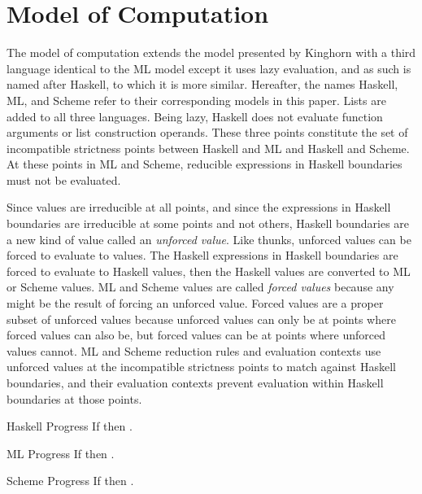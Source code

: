 \section{Model of Computation}

The model of computation extends the model presented by Kinghorn \cite{kinghorn07} with a third language identical to the ML model except it uses lazy evaluation, and as such is named after Haskell, to which it is more similar. Hereafter, the names Haskell, ML, and Scheme refer to their corresponding models in this paper. Lists are added to all three languages. Being lazy, Haskell does not evaluate function arguments or list construction operands. These three points constitute the set of incompatible strictness points between Haskell and ML and Haskell and Scheme. At these points in ML and Scheme, reducible expressions in Haskell boundaries must not be evaluated.

Since values are irreducible at all points, and since the expressions in Haskell boundaries are irreducible at some points and not others, Haskell boundaries are a new kind of value called an \emph{unforced value}. Like thunks, unforced values can be forced to evaluate to values. The Haskell expressions in Haskell boundaries are forced to evaluate to Haskell values, then the Haskell values are converted to ML or Scheme values. ML and Scheme values are called \emph{forced values} because any might be the result of forcing an unforced value. Forced values are a proper subset of unforced values because unforced values can only be at points where forced values can also be, but forced values can be at points where unforced values cannot. ML and Scheme reduction rules and evaluation contexts use unforced values at the incompatible strictness points to match against Haskell boundaries, and their evaluation contexts prevent evaluation within Haskell boundaries at those points.

\begin{theorem}{Haskell Progress}
If \judeh{}{\first{\varexph}}{\vartyh} then \pshyp{\first{\varexph}}{\second{\varexph}}.
\end{theorem}

\begin{theorem}{ML Progress}
If \judem{}{\first{\varexpm}}{\vartym} then \pshyp{\first{\varexpm}}{\second{\varexpm}}.
\end{theorem}

\begin{theorem}{Scheme Progress}
If \judes{}{\first{\varexps}}{\tytst} then \pshyp{\first{\varexps}}{\second{\varexps}}.
\end{theorem}

